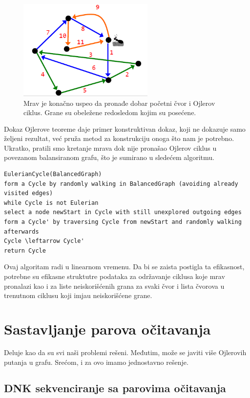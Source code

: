 \begin{figure}[H]
	\centering
	\includegraphics[width=0.6\textwidth]{poglavlja/3/slike/mrav4.png}
	\caption{Mrav je konačno uspeo da pronađe dobar početni čvor i Ojlerov ciklus. Grane su obeležene redosledom kojim su posećene.}
	\label{slika:mrav4}
\end{figure} 


Dokaz Ojlerove teoreme daje primer konstruktivan dokaz, koji ne dokazuje samo željeni rezultat, već pruža metod za konstrukciju onoga što nam je potrebno. Ukratko, pratili smo kretanje mrava dok nije pronašao Ojlerov ciklus u povezanom balansiranom grafu, što je sumirano u sledećem algoritmu.


\begin{verbatim}
EulerianCycle(BalancedGraph)
form a Cycle by randomly walking in BalancedGraph (avoiding already visited edges)
while Cycle is not Eulerian
select a node newStart in Cycle with still unexplored outgoing edges
form a Cycle' by traversing Cycle from newStart and randomly walking afterwards
Cycle \leftarrow Cycle'
return Cycle
\end{verbatim}

Ovaj algoritam radi u linearnom vremenu. Da bi se zaista postigla ta efikasnost, potrebne su efikasne struktutre podataka za održavanje ciklusa koje mrav pronalazi kao i za liste neiskorišćenih grana za svaki čvor i lista čvorova u trenutnom ciklusu koji imjau neiskorišćene grane.


\section{Sastavljanje parova očitavanja}

Deluje kao da su svi naši problemi rešeni. Međutim, može se javiti više Ojlerovih putanja u grafu. Srećom, i za ovo imamo jednostavno rešenje.

\subsection{DNK sekvenciranje sa parovima očitavanja} 

